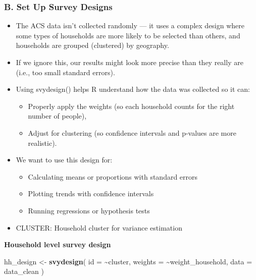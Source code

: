\documentclass[
]{article}
\newenvironment{Shaded}{\begin{snugshade}}{\end{snugshade}}
\newcommand{\AttributeTok}[1]{\textcolor[rgb]{0.13,0.29,0.53}{#1}}
\newcommand{\FunctionTok}[1]{\textcolor[rgb]{0.13,0.29,0.53}{\textbf{#1}}}
\newcommand{\NormalTok}[1]{#1}
\newcommand{\OtherTok}[1]{\textcolor[rgb]{0.56,0.35,0.01}{#1}}
\newcommand{\SpecialCharTok}[1]{\textcolor[rgb]{0.81,0.36,0.00}{\textbf{#1}}}
\providecommand{\tightlist}{%
  \setlength{\itemsep}{0pt}\setlength{\parskip}{0pt}}
\begin{document}
\subsubsection{B. Set Up Survey Designs}\label{b.-set-up-survey-designs}

\begin{itemize}
\item
  The ACS data isn't collected randomly --- it uses a complex design
  where some types of households are more likely to be selected than
  others, and households are grouped (clustered) by geography.
\item
  If we ignore this, our results might look more precise than they
  really are (i.e., too small standard errors).
\item
  Using svydesign() helps R understand how the data was collected so it
  can:

  \begin{itemize}
  \tightlist
  \item
    Properly apply the weights (so each household counts for the right
    number of people),
  \item
    Adjust for clustering (so confidence intervals and p-values are more
    realistic).
  \end{itemize}
\item
  We want to use this design for:

  \begin{itemize}
  \tightlist
  \item
    Calculating means or proportions with standard errors
  \item
    Plotting trends with confidence intervals
  \item
    Running regressions or hypothesis tests
  \end{itemize}
\item
  CLUSTER: Household cluster for variance estimation
\end{itemize}

\textbf{Household level survey design}

\begin{Shaded}
\begin{Highlighting}[]
\NormalTok{hh\_design }\OtherTok{\textless{}{-}} \FunctionTok{svydesign}\NormalTok{(}
  \AttributeTok{id =} \SpecialCharTok{\textasciitilde{}}\NormalTok{cluster,}
  \AttributeTok{weights =} \SpecialCharTok{\textasciitilde{}}\NormalTok{weight\_household,}
  \AttributeTok{data =}\NormalTok{ data\_clean}
\NormalTok{)}
\end{Highlighting}
\end{Shaded}
\end{document}
